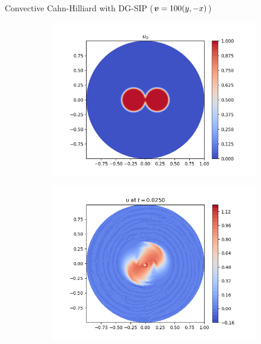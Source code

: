 \begin{frame}{Convective Cahn-Hilliard with DG-SIP {\small($\boldsymbol{v}=100(y,-x)$)}}
	\vspace{-0.3cm}
	\begin{figure}[t]
		\begin{subfigure}{0.49\textwidth}
			\centering
			\includegraphics[scale=0.28]{img/convective-cahn-hilliard/u0.png}
		\end{subfigure}
		\hspace*{-1.5cm}
		\begin{subfigure}{0.49\textwidth}
			\centering
			\includegraphics[scale=0.28]{img/convective-cahn-hilliard/u_DG-SIP-Sig+Eyre_nt-100_t-0.02500_P1_adv-100.0_nx-50.png}
		\end{subfigure}

\end{figure}
\end{frame}
